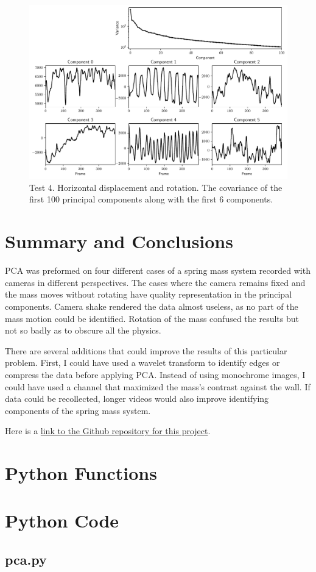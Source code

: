 \documentclass{article}
\begin{document}
    \begin{figure}[p]
        \includegraphics[width=\textwidth]{PCA_4.pdf}
        \caption{Test 4. Horizontal displacement and rotation. The covariance of
        the first 100 principal components along with the first 6 components.
        \label{fig:test_4}}
    \end{figure}


    \section{Summary and Conclusions}
    PCA was preformed on four different cases of a spring mass system recorded
    with cameras in different perspectives. The cases where the camera remains
    fixed and the mass moves without rotating have quality representation in the
    principal components. Camera shake rendered the data almost useless, as
    no part of the mass motion could be identified. Rotation of the mass
    confused the results but not so badly as to obscure all the physics.

    There are several additions that could improve the results of this
    particular problem. First, I could have used a wavelet transform to 
    identify edges or compress the data before applying PCA. Instead of using
    monochrome images, I could have used a channel that maximized the mass's
    contrast against the wall. If data could be recollected, longer videos would
    also improve identifying components of the spring mass system.

    
    

    \FloatBarrier
    \newpage
    \appendix
    Here is a \href{https://github.com/bagriffith/AMATH582/tree/main/HW3}
    {link to the Github repository for this project}.
    \section{Python Functions}
    

    \section{Python Code}
    \subsection{pca.py}
    \inputminted{python}{../code/pca.py}
\end{document}
